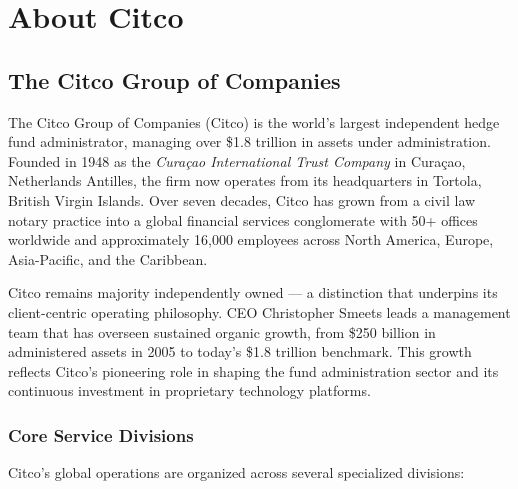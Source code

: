 
\chapter{About Citco}
\label{chap:about_company}

\FloatBarrier

\section{The Citco Group of Companies}

The Citco Group of Companies (Citco) is the world's largest independent hedge fund administrator, managing over \$1.8 trillion in assets under administration. Founded in 1948 as the \textit{Curaçao International Trust Company} in Curaçao, Netherlands Antilles, the firm now operates from its headquarters in Tortola, British Virgin Islands. Over seven decades, Citco has grown from a civil law notary practice into a global financial services conglomerate with 50+ offices worldwide and approximately 16,000 employees across North America, Europe, Asia-Pacific, and the Caribbean.

Citco remains majority independently owned --- a distinction that underpins its client-centric operating philosophy. CEO Christopher Smeets leads a management team that has overseen sustained organic growth, from \$250 billion in administered assets in 2005 to today's \$1.8 trillion benchmark. This growth reflects Citco's pioneering role in shaping the fund administration sector and its continuous investment in proprietary technology platforms.

\subsection{Core Service Divisions}

Citco's global operations are organized across several specialized divisions:

